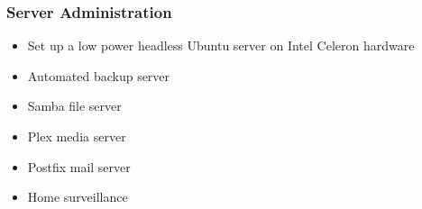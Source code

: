 \documentclass[aspectratio=169]{beamer}
\begin{document}
\begin{frame}
  \frametitle{Server Administration}
  \begin{itemize}
  \item Set up a low power headless Ubuntu server on Intel Celeron hardware
    \item Automated backup server
    \item Samba file server
    \item Plex media server
    \item Postfix mail server
    \item Home surveillance
  \end{itemize}
\end{frame}
\end{document}
